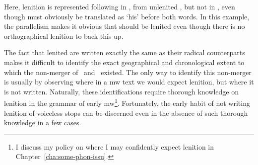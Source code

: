 
Here, lenition is represented following   in , from unlenited , but not in , even though  must obviously be translated as `his' before both words. In this example, the parallelism makes it obvious that  should be lenited even though there is no orthographical lenition to back this up.

The fact that lenited  are written exactly the same as their radical counterparts makes it difficult to identify the exact geographical and chronological extent to which the non-merger of \xD\ and \lT\ existed. The only way to identify this non-merger is usually by observing where in a \gls{mw} text we would expect lenition, but where it is not written. Naturally, these identifications require thorough knowledge on lenition in  the grammar of early \gls{mw}\footnote{I discuss my policy on where I may confidently expect lenition in Chapter~\ref{cha:some-phon-issu}.}. Fortunately, the early habit of not writing lenition of voiceless stops can be discerned even in the absence of such thorough knowledge in a few cases.


